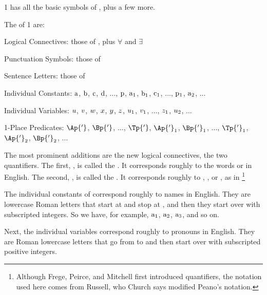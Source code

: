 \GQL{}1 has all the basic symbols of \GSL{}, plus a few more. 
\begin{majorILnc}{}
The  of \GQL{}1 are:
\begin{cenumerate}
\item Logical Connectives: those of \GSL{}, plus $\forall$ and $\exists$
\item Punctuation Symbols: those of \GSL{}
\item Sentence Letters: those of \GSL{}
\item Individual Constants: $\mathrm{a}$, $\mathrm{b}$, $\mathrm{c}$, $\mathrm{d}$, $\ldots$, $\mathrm{p}$, $\mathrm{a}_1$, $\mathrm{b}_1$, $\mathrm{c}_1$, $\ldots$, $\mathrm{p}_1$, $\mathrm{a}_2$, $\ldots$
\item Individual Variables: $u$, $v$, $w$, $x$, $y$, $z$, $u_1$, $v_1$, $\ldots$, $z_1$, $u_2$, $\ldots$
\item 1-Place Predicates: $\Ap{'}$, $\Bp{'}$, $\ldots$, $\Tp{'}$, $\Ap{'}_1$, $\Bp{'}_1$, $\ldots$, $\Tp{'}_1$, $\Ap{'}_2$, $\Bp{'}_2$, $\ldots$
\end{cenumerate}
\end{majorILnc}
\noindent{}The most prominent additions are the new logical connectives, the two quantifiers.  The first, \mention{$\forall$}, is called the . 
It corresponds roughly to the words  or  in English. 
The second, \mention{$\exists$}, is called the . 
It corresponds roughly to , , or , as in \footnote{Although Frege, Peirce, and Mitchell first introduced quantifiers, the notation used here comes from Russell, who Church \citeyearpar[288]{Church1956} says modified Peano's notation.}

The individual constants of \GQL{} correspond roughly to names in English. 
They are lowercase Roman letters that start at  and stop at , and then they start over with subscripted integers.  So we have, for example, $\mathrm{a_1}$, $\mathrm{a_2}$, $\mathrm{a_3}$, and so on. 

Next, the individual variables correspond roughly to pronouns in English. 
They are Roman lowercase letters that go from  to  and then start over with subscripted positive integers. 


